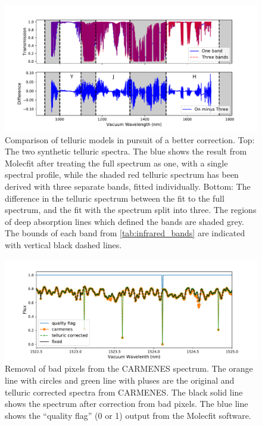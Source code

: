 \begin{figure}
    \centering
    \includegraphics[width=0.9\linewidth]{figures/information-content/Carmenes/compare_telluric_corrections_shaded}
    \caption[]{Comparison of telluric models in pursuit of a better correction.
        Top: The two synthetic telluric spectra.
        The blue shows the result from {Molecfit} after treating the full spectrum as one, with a single spectral profile, while the shaded red telluric spectrum has been derived with three separate bands, fitted individually.
        Bottom: The difference in the telluric spectrum between the fit to the full spectrum, and the fit with the spectrum split into three.
        The regions of deep  absorption lines which defined the \nir{} bands are shaded grey.
        The bounds of each band from \cref{tab:infrared_bands} are indicated with vertical black dashed lines.}
    \label{fig:compare_telluric_corrections}
\end{figure}


\begin{figure}
    \centering
    \includegraphics[width=0.9\linewidth]{figures/information-content/Carmenes/carmenes_spike_removal}
    \caption[Bad pixel removal in {CARMENES}.]{Removal of bad pixels from the {CARMENES} spectrum. The orange line with circles and green line with pluses are the original and telluric corrected spectra from {CARMENES}.
    The black solid line shows the spectrum after correction from bad pixels.
    The blue line shows the ``quality flag'' (0 or 1) output from the {Molecfit} software.}
    \label{fig:carmenes_spike_removal}
\end{figure}



